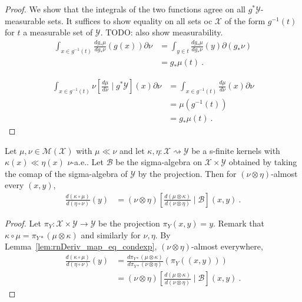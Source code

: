 \begin{proof}\leanok
\uses{}
We show that the integrals of the two functions agree on all $g^* \mathcal Y$-measurable sets. It suffices to show equality on all sets oc $\mathcal X$ of the form $g^{-1}(t)$ for $t$ a measurable set of $\mathcal Y$.
TODO: also show measurability.
\begin{align*}
\int_{x \in g^{-1}(t)}\frac{d g_*\mu}{d g_*\nu}(g(x)) \partial\nu
&= \int_{y \in t}\frac{d g_*\mu}{d g_*\nu}(y) \partial(g_*\nu)
\\
&= g_*\mu (t)
\: .
\end{align*}

\begin{align*}
\int_{x \in g^{-1}(t)}\nu\left[ \frac{d \mu}{d \nu} \mid g^* \mathcal Y\right](x) \partial\nu
&= \int_{x \in g^{-1}(t)}\frac{d \mu}{d \nu}(x) \partial\nu
\\
&= \mu(g^{-1}(t))
\\
&= g_*\mu(t)
\: .
\end{align*}


\end{proof}


\begin{lemma}
  \label{lem:rnDeriv_comp_eq_condexp}
  \leanok
  \uses{}
  Let $\mu, \nu \in \mathcal M(\mathcal X)$ with $\mu \ll \nu$ and let $\kappa, \eta : \mathcal X \rightsquigarrow \mathcal Y$ be a s-finite kernels with $\kappa(x) \ll \eta(x)$ $\nu$-a.e..
  Let $\mathcal B$ be the sigma-algebra on $\mathcal X \times \mathcal Y$ obtained by taking the comap of the sigma-algebra of $\mathcal Y$ by the projection.
  Then for $(\nu \otimes \eta)$-almost every $(x,y)$,
  \begin{align*}
  \frac{d(\kappa \circ \mu)}{d(\eta \circ \nu)}(y)
  &= (\nu \otimes \eta)\left[ \frac{d (\mu \otimes \kappa)}{d (\nu \otimes \eta)} \mid \mathcal B \right](x,y)
  \: .
  \end{align*}
\end{lemma}

\begin{proof}\leanok
{}
Let $\pi_Y : \mathcal X \times \mathcal Y \to \mathcal Y$ be the projection $\pi_Y(x,y) = y$.
Remark that $\kappa \circ \mu = \pi_{Y*}(\mu \otimes \kappa)$ and similarly for $\nu, \eta$.
By Lemma~\ref{lem:rnDeriv_map_eq_condexp}, $(\nu \otimes \eta)$-almost everywhere,
\begin{align*}
\frac{d(\kappa \circ \mu)}{d(\eta \circ \nu)}(y)
&= \frac{d \pi_{Y*}(\mu \otimes \kappa)}{d \pi_{Y*}(\nu \otimes \eta)}(\pi_Y((x,y)))
\\
&= (\nu \otimes \eta)\left[ \frac{d (\mu \otimes \kappa)}{d (\nu \otimes \eta)} \mid \mathcal B\right](x,y)
\: .
\end{align*}
\end{proof}


